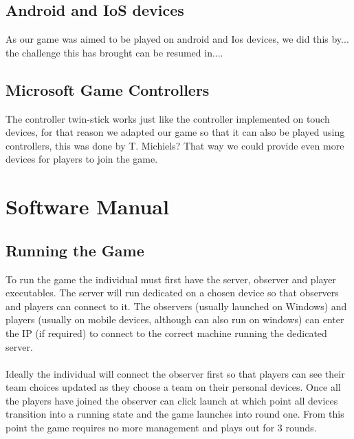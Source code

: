 \documentclass[11pt,a4paper]{article}
\begin{document}
 \subsection{Android and IoS devices} 
 As our game was aimed to be played on android and Ios devices, we did this by... the challenge this has brought can be resumed in....

 \subsection{Microsoft Game Controllers}
The controller twin-stick works just like the controller implemented on touch devices, for that reason we adapted our game so that it can also be played using controllers, this was done by T. Michiels? That way we could provide even more devices for players to join the game.  


\pagebreak

 \section{Software Manual}

 \subsection{Running the Game}
 To run the game the individual must first have the server, observer and player executables. The server will run dedicated on a chosen device so that observers and players can connect to it. The observers (usually launched on Windows)  and players (usually on mobile devices, although can also run on windows) can enter the IP (if required) to connect to the correct machine running the dedicated server. \\ \\
 Ideally the individual will connect the observer first so that players can see their team choices updated as they choose a team on their personal devices. Once all the players have joined the observer can click launch at which point all devices transition into a running state and the game launches into round one. From this point the game requires no more management and plays out for 3 rounds.
\end{document}
